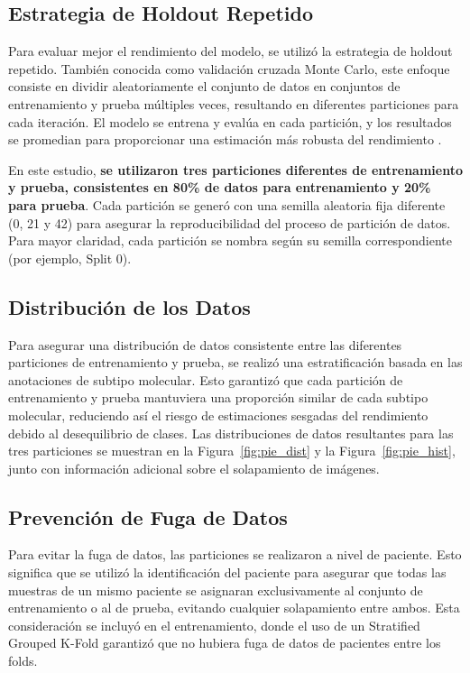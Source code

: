 \documentclass[a4paper,10pt]{book}
\begin{document}
\subsection{Estrategia de Holdout Repetido}

Para evaluar mejor el rendimiento del modelo, se utilizó la estrategia de holdout repetido. También conocida como validación cruzada Monte Carlo, este enfoque consiste en dividir aleatoriamente el conjunto de datos en conjuntos de entrenamiento y prueba múltiples veces, resultando en diferentes particiones para cada iteración. El modelo se entrena y evalúa en cada partición, y los resultados se promedian para proporcionar una estimación más robusta del rendimiento \cite{marzbanAllModelsAre2020}.

En este estudio, \textbf{se utilizaron tres particiones diferentes de entrenamiento y prueba, consistentes en 80\% de datos para entrenamiento y 20\% para prueba}. Cada partición se generó con una semilla aleatoria fija diferente (0, 21 y 42) para asegurar la reproducibilidad del proceso de partición de datos. Para mayor claridad, cada partición se nombra según su semilla correspondiente (por ejemplo, Split 0).

\subsection{Distribución de los Datos}

Para asegurar una distribución de datos consistente entre las diferentes particiones de entrenamiento y prueba, se realizó una estratificación basada en las anotaciones de subtipo molecular. Esto garantizó que cada partición de entrenamiento y prueba mantuviera una proporción similar de cada subtipo molecular, reduciendo así el riesgo de estimaciones sesgadas del rendimiento debido al desequilibrio de clases. Las distribuciones de datos resultantes para las tres particiones se muestran en la Figura~\ref{fig:pie_dist} y la Figura~\ref{fig:pie_hist}, junto con información adicional sobre el solapamiento de imágenes.

\subsection{Prevención de Fuga de Datos}

Para evitar la fuga de datos, las particiones se realizaron a nivel de paciente. Esto significa que se utilizó la identificación del paciente para asegurar que todas las muestras de un mismo paciente se asignaran exclusivamente al conjunto de entrenamiento o al de prueba, evitando cualquier solapamiento entre ambos. Esta consideración se incluyó en el entrenamiento, donde el uso de un Stratified Grouped K-Fold garantizó que no hubiera fuga de datos de pacientes entre los folds.
\end{document}

